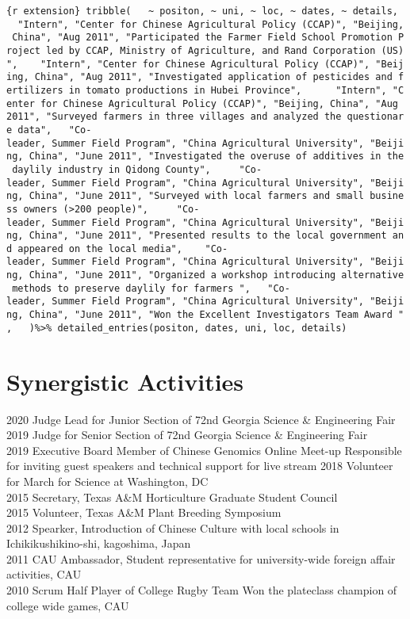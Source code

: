 \documentclass[11pt, a4paper]{awesome-cv}
\begin{document}
\texttt{\{r\ extension\}\ tribble(\ \ \ \textasciitilde{}\ positon,\ \textasciitilde{}\ uni,\ \textasciitilde{}\ loc,\ \textasciitilde{}\ dates,\ \textasciitilde{}\ details,\ \ \ "Intern",\ "Center\ for\ Chinese\ Agricultural\ Policy\ (CCAP)",\ "Beijing,\ China",\ "Aug\ 2011",\ "Participated\ the\ Farmer\ Field\ School\ Promotion\ Project\ led\ by\ CCAP,\ Ministry\ of\ Agriculture,\ and\ Rand\ Corporation\ (US)",\ \ \ \ "Intern",\ "Center\ for\ Chinese\ Agricultural\ Policy\ (CCAP)",\ "Beijing,\ China",\ "Aug\ 2011",\ "Investigated\ application\ of\ pesticides\ and\ fertilizers\ in\ tomato\ productions\ in\ Hubei\ Province",\ \ \ \ \ \ "Intern",\ "Center\ for\ Chinese\ Agricultural\ Policy\ (CCAP)",\ "Beijing,\ China",\ "Aug\ 2011",\ "Surveyed\ farmers\ in\ three\ villages\ and\ analyzed\ the\ questionare\ data",\ \ \ "Co-leader,\ Summer\ Field\ Program",\ "China\ Agricultural\ University",\ "Beijing,\ China",\ "June\ 2011",\ "Investigated\ the\ overuse\ of\ additives\ in\ the\ daylily\ industry\ in\ Qidong\ County",\ \ \ \ \ "Co-leader,\ Summer\ Field\ Program",\ "China\ Agricultural\ University",\ "Beijing,\ China",\ "June\ 2011",\ "Surveyed\ with\ local\ farmers\ and\ small\ business\ owners\ (\textgreater{}200\ people)",\ \ \ \ \ "Co-leader,\ Summer\ Field\ Program",\ "China\ Agricultural\ University",\ "Beijing,\ China",\ "June\ 2011",\ "Presented\ results\ to\ the\ local\ government\ and\ appeared\ on\ the\ local\ media",\ \ \ \ "Co-leader,\ Summer\ Field\ Program",\ "China\ Agricultural\ University",\ "Beijing,\ China",\ "June\ 2011",\ "Organized\ a\ workshop\ introducing\ alternative\ methods\ to\ preserve\ daylily\ for\ farmers\ ",\ \ \ "Co-leader,\ Summer\ Field\ Program",\ "China\ Agricultural\ University",\ "Beijing,\ China",\ "June\ 2011",\ "Won\ the\ Excellent\ Investigators\ Team\ Award\ ",\ \ \ )\%\textgreater{}\%\ detailed\_entries(positon,\ dates,\ uni,\ loc,\ details)}

\section{Synergistic Activities}\label{synergistic-activities}

2020 Judge Lead for Junior Section of 72nd Georgia Science \&
Engineering Fair\\
2019 Judge for Senior Section of 72nd Georgia Science \& Engineering
Fair\\
2019 Executive Board Member of Chinese Genomics Online Meet-up
\textbar{} Responsible for inviting guest speakers and technical support
for live stream 2018 Volunteer for March for Science at Washington, DC\\
2015 Secretary, Texas A\&M Horticulture Graduate Student Council\\
2015 Volunteer, Texas A\&M Plant Breeding Symposium\\
2012 Spearker, Introduction of Chinese Culture with local schools in
Ichikikushikino-shi, kagoshima, Japan\\
2011 CAU Ambassador, Student representative for university-wide foreign
affair activities, CAU\\
2010 Scrum Half Player of College Rugby Team \textbar{} Won the
plateclass champion of college wide games, CAU
\end{document}
